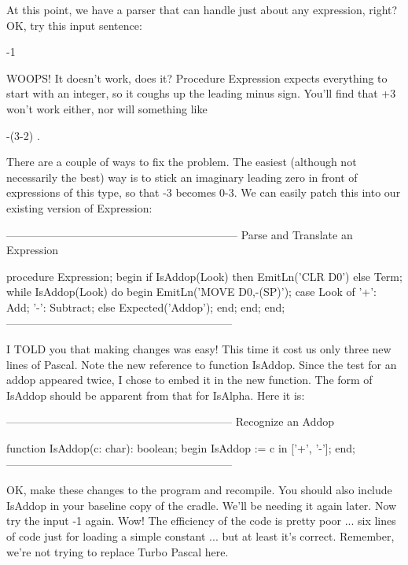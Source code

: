 \documentclass[float=false, crop=false]{standalone}
\begin{document}
At this point, we have a parser that can handle just about any expression,
right? OK, try this input sentence:

                         -1

WOOPS! It doesn't work, does it? Procedure Expression expects everything to
start with an integer, so it coughs up the leading minus sign. You'll find that
+3 won't work either, nor will something like

                    -(3-2) .

There are a couple of ways to fix the problem. The easiest (although not
necessarily the best) way is to stick an imaginary leading zero in front of
expressions of this type, so that -3 becomes 0-3. We can easily patch this into
our existing version of Expression:

\begin{code}
{---------------------------------------------------------------}
{ Parse and Translate an Expression }

procedure Expression;
begin
   if IsAddop(Look) then
      EmitLn('CLR D0')
   else
      Term;
   while IsAddop(Look) do begin
      EmitLn('MOVE D0,-(SP)');
      case Look of
       '+': Add;
       '-': Subtract;
      else Expected('Addop');
      end;
   end;
end;
{--------------------------------------------------------------}
\end{code}

I TOLD you that making changes was easy! This time it cost us only three new
lines of Pascal. Note the new reference to function IsAddop. Since the test for
an addop appeared twice, I chose to embed it in the new function. The form of
IsAddop should be apparent from that for IsAlpha. Here it is:

\begin{code}
{--------------------------------------------------------------}
{ Recognize an Addop }

function IsAddop(c: char): boolean;
begin
   IsAddop := c in ['+', '-'];
end;
{--------------------------------------------------------------}
\end{code}

OK, make these changes to the program and recompile. You should also include
IsAddop in your baseline copy of the cradle. We'll be needing it again later.
Now try the input -1 again. Wow! The efficiency of the code is pretty poor ...
six lines of code just for loading a simple constant ... but at least it's
correct. Remember, we're not trying to replace Turbo Pascal here.
\end{document}

